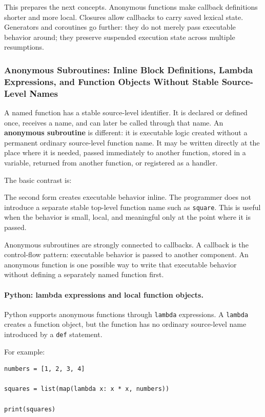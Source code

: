 This prepares the next concepts. Anonymous functions make callback definitions shorter and more local. Closures allow callbacks to carry saved lexical state. Generators and coroutines go further: they do not merely pass executable behavior around; they preserve suspended execution state across multiple resumptions.


\subsubsection{Anonymous Subroutines: Inline Block Definitions, Lambda Expressions, and Function Objects Without Stable Source-Level Names}

A named function has a stable source-level identifier. It is declared or defined once, receives a name, and can later be called through that name. An \textbf{anonymous subroutine} is different: it is executable logic created without a permanent ordinary source-level function name. It may be written directly at the place where it is needed, passed immediately to another function, stored in a variable, returned from another function, or registered as a handler.

The basic contrast is:

The second form creates executable behavior inline. The programmer does not introduce a separate stable top-level function name such as \texttt{square}. This is useful when the behavior is small, local, and meaningful only at the point where it is passed.

Anonymous subroutines are strongly connected to callbacks. A callback is the control-flow pattern: executable behavior is passed to another component. An anonymous function is one possible way to write that executable behavior without defining a separately named function first.

\paragraph{Python: lambda expressions and local function objects.}

Python supports anonymous functions through \texttt{lambda} expressions. A \texttt{lambda} creates a function object, but the function has no ordinary source-level name introduced by a \texttt{def} statement.

For example:

\begin{verbatim}
numbers = [1, 2, 3, 4]

squares = list(map(lambda x: x * x, numbers))

print(squares)
\end{verbatim}

